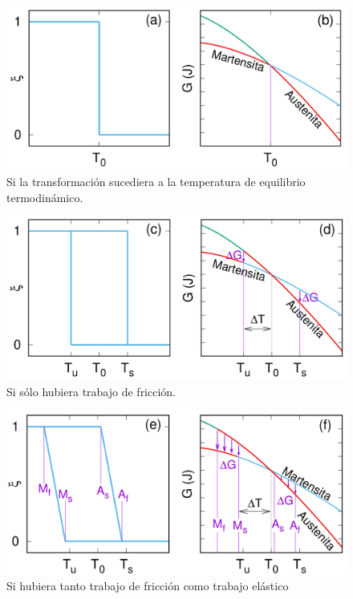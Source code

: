 \documentclass[11pt]{beamer}
\begin{document}
		\begin{frame}
			\begin{figure}
				\includegraphics[scale=0.25]{img/GibbsIdealCase.png}
				\caption*{Si la transformación sucediera a la temperatura de equilibrio termodinámico.}		
			\end{figure}
		\end{frame}
		
		\begin{frame}
			\begin{figure}
				\includegraphics[scale=0.25]{img/GibbsWithFriction.png}
				\caption*{Si sólo hubiera trabajo de fricción.}
			\end{figure}
		\end{frame}

		\begin{frame}
			\begin{figure}
				\includegraphics[scale=0.25]{img/GibbsElasticEnergy.png}
				\caption*{Si hubiera tanto trabajo de fricción como trabajo elástico}
			\end{figure}
		\end{frame}
\end{document}
